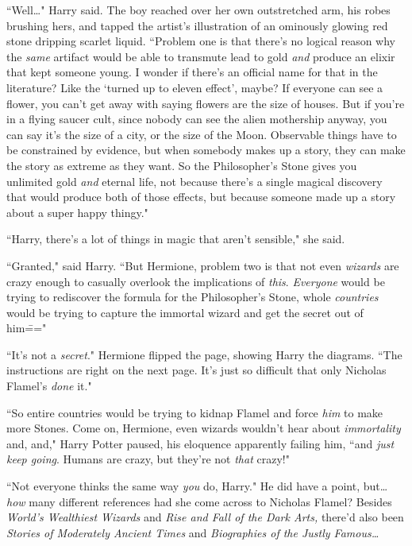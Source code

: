 ``Well{\ldots}" Harry said. The boy reached over her own outstretched arm, his robes brushing hers, and tapped the artist's illustration of an ominously glowing red stone dripping scarlet liquid. ``Problem one is that there's no logical reason why the \emph{same} artifact would be able to transmute lead to gold \emph{and} produce an elixir that kept someone young. I wonder if there's an official name for that in the literature? Like the `turned up to eleven effect', maybe? If everyone can see a flower, you can't get away with saying flowers are the size of houses. But if you're in a flying saucer cult, since nobody can see the alien mothership anyway, you can say it's the size of a city, or the size of the Moon. Observable things have to be constrained by evidence, but when somebody makes up a story, they can make the story as extreme as they want. So the Philosopher's Stone gives you unlimited gold \emph{and} eternal life, not because there's a single magical discovery that would produce both of those effects, but because someone made up a story about a super happy thingy."

``Harry, there's a lot of things in magic that aren't sensible," she said.

``Granted," said Harry. ``But Hermione, problem two is that not even \emph{wizards} are crazy enough to casually overlook the implications of \emph{this}. \emph{Everyone} would be trying to rediscover the formula for the Philosopher's Stone, whole \emph{countries} would be trying to capture the immortal wizard and get the secret out of him\==="

``It's not a \emph{secret}." Hermione flipped the page, showing Harry the diagrams. ``The instructions are right on the next page. It's just so difficult that only Nicholas Flamel's \emph{done} it."

``So entire countries would be trying to kidnap Flamel and force \emph{him} to make more Stones. Come on, Hermione, even wizards wouldn't hear about \emph{immortality} and, and," Harry Potter paused, his eloquence apparently failing him, ``and \emph{just keep going}. Humans are crazy, but they're not \emph{that} crazy!"

``Not everyone thinks the same way \emph{you} do, Harry." He did have a point, but{\ldots} \emph{how} many different references had she come across to Nicholas Flamel? Besides \emph{World's Wealthiest Wizards} and \emph{Rise and Fall of the Dark Arts,} there'd also been \emph{Stories of Moderately Ancient Times} and \emph{Biographies of the Justly Famous{\ldots}}

